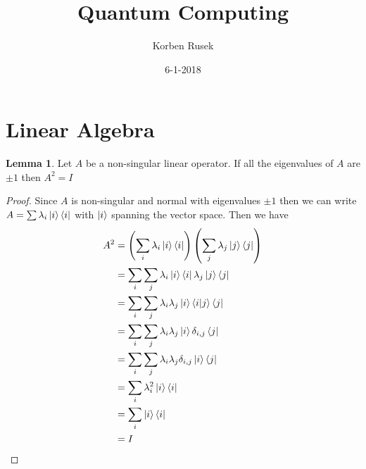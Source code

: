 \documentclass{article}
\author{Korben Rusek}
\title{Quantum Computing}
\date{6-1-2018}
\begin{document}
\maketitle
\newcommand{\gindex}[2]{|#1\!:\!#2|}
\newcommand{\lcm}{\textrm{lcm}}
\newcommand{\irr}{\textrm{irr}}
\newcommand{\sylp}{$Syl_{p}$}
\newcommand{\phnt}[1]{$\phantom{1}^{#1}$}
\newcommand{\gen}[1]{\langle#1\rangle}
\newcommand{\BN}{\mathbb{N}}
\newcommand{\BZ}{\mathbb{Z}}
\newcommand{\BQ}{\mathbb{Q}}
\newcommand{\BR}{\mathbb{R}}
\newcommand{\BC}{\mathbb{C}}
\newcommand{\BF}{\mathbb{F}}
\newcommand{\CF}{\mathcal{F}}
\newcommand{\CQ}{\mathcal{Q}}
\newcommand{\fa}{\mathfrak{a}}
\newcommand{\fb}{\mathfrak{b}}
\newcommand{\fp}{\mathfrak{p}}
\newcommand{\fq}{\mathfrak{q}}
\newcommand{\fm}{\mathfrak{m}}
\newcommand{\FN}{\mathfrak{N}}
\newcommand{\FR}{\mathfrak{R}}
\newcommand{\set}[1]{\{#1\}}
\newcommand{\trv}{\set{1}}
\newcommand{\Aut}{\mathrm{Aut}}
\newcommand{\End}{\mathrm{End}}
\newcommand{\Ker}{\mathrm{Ker}}
\newcommand{\chr}{\mathrm{char}}

\theoremstyle{definition}
\newtheorem{theorem}{Theorem}[section]
\newtheorem{definition}[theorem]{Definition}
\newtheorem{lemma}[theorem]{Lemma}
\newtheorem{exercise}{Exercise}[section]

\setcounter{section}{1}
\section{Linear Algebra}
\begin{lemma}
  Let $A$ be a non-singular linear operator.
  If all the eigenvalues of $A$ are $\pm 1$ then $A^2=I$
  \begin{proof}
    Since $A$ is non-singular and normal with eigenvalues $\pm1$ then we
    can write $A=\sum\lambda_i\ket{i}\bra{i}$ with $\ket{i}$ spanning the
    vector space. Then we
    have
    \begin{align*}
      A^2&=\left(\sum_i\lambda_i\ket{i}\bra{i}\right)\left(\sum_j\lambda_j\ket{j}\bra{j}\right) \\
      &=\sum_i\sum_j\lambda_i\ket{i}\bra{i}\lambda_j\ket{j}\bra{j} \\
      &=\sum_i\sum_j\lambda_i\lambda_j\ket{i}\bra{i}\ket{j}\bra{j} \\
      &=\sum_i\sum_j\lambda_i\lambda_j\ket{i}\delta_{i,j}\bra{j} \\
      &=\sum_i\sum_j\lambda_i\lambda_j\delta_{i,j}\ket{i}\bra{j} \\
      &=\sum_i\lambda_i^2\ket{i}\bra{i} \\
      &=\sum_i\ket{i}\bra{i} \\
      &=I
    \end{align*}
  \end{proof}
\end{lemma}
\end{document}
